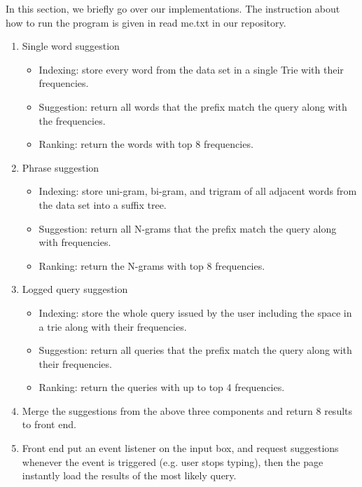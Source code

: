 \documentclass{article}
\begin{document}
In this section, we briefly go over our implementations. The instruction about how to run the program is given in read me.txt in our repository. 
\begin{enumerate}
  \item Single word suggestion
  \begin{itemize}
  \item  Indexing: store every word from the data set in a single Trie with their frequencies.
  \item Suggestion: return all words that the prefix match the query along with the frequencies. 
  \item Ranking: return the words with top 8 frequencies.
\end{itemize}
	
	
  \item Phrase suggestion
  
  \begin{itemize} 
	\item Indexing: store uni-gram, bi-gram, and trigram of all adjacent words from the data set into a suffix tree.
	\item Suggestion: return all N-grams that the prefix match the query along with frequencies.
	\item Ranking: return the N-grams with top 8 frequencies.
\end{itemize}
  \item Logged query suggestion
  \begin{itemize} 

\item Indexing: store the whole query issued by the user including the space in a trie along with their frequencies.
\item Suggestion: return all queries that the prefix match the query along with their frequencies.
\item Ranking: return the queries with up to top 4 frequencies.
\end{itemize}

\item

Merge the suggestions from the above three components and return 8 results to front end.

\item

Front end put an event listener on the input box, and request suggestions whenever the event is triggered (e.g. user stops typing), then the page instantly load the results of the most likely query.
	

\end{enumerate}
\end{document}
